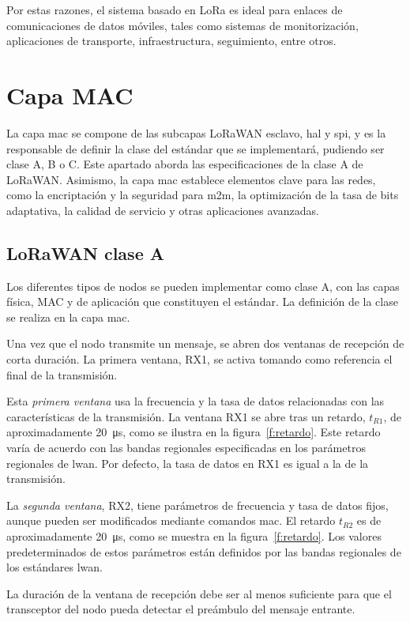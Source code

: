 Por estas razones, el sistema basado en LoRa es ideal para enlaces de comunicaciones de datos móviles, tales como sistemas de monitorización, aplicaciones de transporte, infraestructura, seguimiento, entre otros.

\section{Capa MAC} \label{secc:clases}

La capa \gls{mac} se compone de las subcapas LoRaWAN esclavo, \gls{hal} y \gls{spi}, y es la responsable de definir la clase del estándar que se implementará, pudiendo ser clase A, B o C. Este apartado aborda las especificaciones de la clase A de LoRaWAN. Asimismo, la capa \gls{mac} establece elementos clave para las redes, como la encriptación y la seguridad para \gls{m2m}, la optimización de la tasa de bits adaptativa, la calidad de servicio y otras aplicaciones avanzadas.

\subsection{LoRaWAN clase A}

Los diferentes tipos de nodos se pueden implementar como clase A, con las capas física, MAC y de aplicación que constituyen el estándar. La definición de la clase se realiza en la capa \gls{mac}.

Una vez que el nodo transmite un mensaje, se abren dos ventanas de recepción de corta duración. La primera ventana, RX1, se activa tomando como referencia el final de la transmisión.

Esta \emph{primera ventana} usa la frecuencia y la tasa de datos relacionadas con las características de la transmisión. La ventana RX1 se abre tras un retardo, $t_{R1}$, de aproximadamente \SI{20}{\us}, como se ilustra en la figura~\ref{f:retardo}. Este retardo varía de acuerdo con las bandas regionales especificadas en los parámetros regionales de \gls{lwan}. Por defecto, la tasa de datos en RX1 es igual a la de la transmisión.

La \emph{segunda ventana}, RX2, tiene parámetros de frecuencia y tasa de datos fijos, aunque pueden ser modificados mediante comandos \gls{mac}. El retardo $t_{R2}$ es de aproximadamente \SI{20}{\us}, como se muestra en la figura~\ref{f:retardo}. Los valores predeterminados de estos parámetros están definidos por las bandas regionales de los estándares \gls{lwan}.

La duración de la ventana de recepción debe ser al menos suficiente para que el transceptor del nodo pueda detectar el preámbulo del mensaje entrante.

